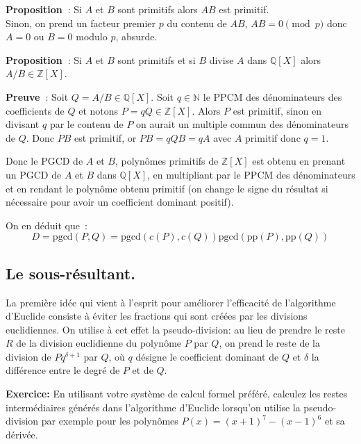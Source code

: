 \documentclass[a4paper,11pt]{article}
\newcommand{\Z}{{\mathbb{Z}}}
\newcommand{\N}{{\mathbb{N}}}
\newcommand{\Q}{{\mathbb{Q}}}
\begin{document}
\begin{giacjshere}
{\bf Proposition~}: Si $A$ et $B$ sont primitifs alors $AB$ est
primitif.\\
Sinon, on prend un facteur premier $p$ du contenu de $AB$, 
$AB=0 \pmod p$ donc $A=0$ ou $B=0$ modulo $p$, absurde.

{\bf Proposition~}: Si $A$ et $B$ sont primitifs et si $B$ divise $A$
dans $\Q[X]$ alors $A/B \in \Z[X]$.

{\bf Preuve~}: Soit $Q=A/B \in \Q[X]$. Soit $q \in \N $ le PPCM des
d\'enominateurs des coefficients de $Q$ et notons $P=qQ \in \Z[X]$.
Alors $P$ est primitif, sinon en divisant $q$ par le contenu de $P$ on
aurait un multiple commun des d\'enominateurs de $Q$. Donc $PB$ est
primitif, or $ P B = qQB=q A $ avec $A$ primitif donc $q=1$.

Donc le PGCD de $A$ et $B$, polyn\^omes primitifs de $\Z[X]$ est
obtenu en prenant un PGCD de $A$ et $B$ dans $\Q[X]$, en multipliant
par le PPCM des d\'enominateurs et en rendant le polyn\^ome obtenu
primitif (on change le signe du r\'esultat si n\'ecessaire pour avoir
un coefficient dominant positif).

On en d\'eduit que~:
\[ D = \mbox{pgcd} ( P, Q ) = \mbox{pgcd} ( c ( P ), c ( Q )) \mbox{pgcd} (
   \mbox{pp} ( P ), \mbox{pp} ( Q )) \]


\subsection{Le sous-résultant.}

La première idée qui vient à l'esprit pour améliorer l'efficacité de
l'algorithme d'Euclide consiste à éviter les fractions qui sont créées par les
divisions euclidiennes. On utilise à cet effet la pseudo-division: au lieu de
prendre le reste $R$ de la division euclidienne du polynôme $P$ par $Q$, on
prend le reste de la division de $P q^{\delta + 1}$ par $Q$, où $q$ désigne le
coefficient dominant de $Q$ et $\delta$ la différence entre le degré de $P$ et
de $Q$.

{\bf{Exercice:}} En utilisant votre système de calcul formel préféré,
calculez les restes intermédiaires générés dans l'algorithme d'Euclide
lorsqu'on utilise la pseudo-division par exemple pour les polynômes $P ( x ) =
( x + 1 )^7 - ( x - 1 )^6$ et sa dérivée.


\end{giacjshere}
\end{document}
